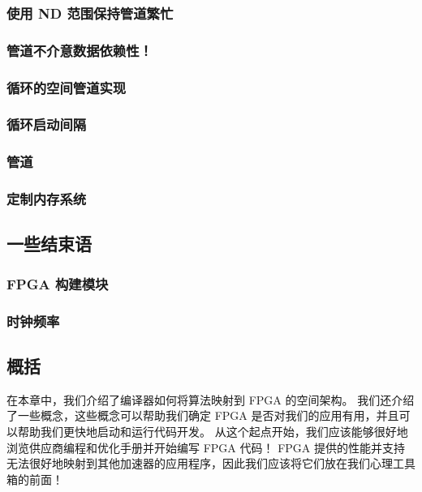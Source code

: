 \subsubsection{使用 ND 范围保持管道繁忙}

\subsubsection{管道不介意数据依赖性！}

\subsubsection{循环的空间管道实现}

\subsubsection{循环启动间隔}

\subsubsection{管道}

\subsubsection{定制内存系统}

\subsection{一些结束语}

\subsubsection{FPGA 构建模块}

\subsubsection{时钟频率}

\subsection{概括}
在本章中，我们介绍了编译器如何将算法映射到 FPGA 的空间架构。 
我们还介绍了一些概念，这些概念可以帮助我们确定 FPGA 是否对我们的应用有用，并且可以帮助我们更快地启动和运行代码开发。 
从这个起点开始，我们应该能够很好地浏览供应商编程和优化手册并开始编写 FPGA 代码！ 
FPGA 提供的性能并支持无法很好地映射到其他加速器的应用程序，因此我们应该将它们放在我们心理工具箱的前面！